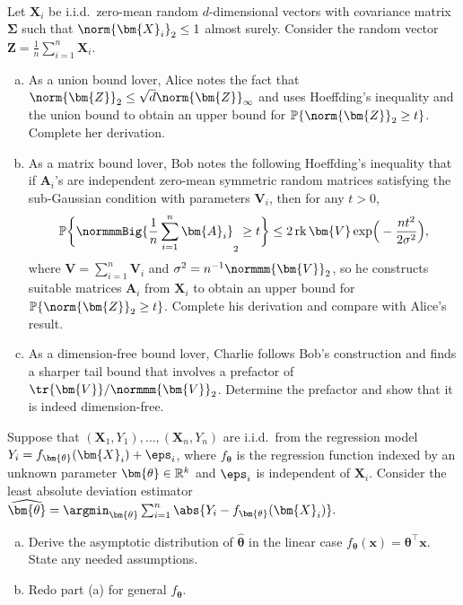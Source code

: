 \documentclass[12pt, a3paper, openany]{book}
\begin{document}
\begin{Prob}\ 

Let $\bm{X}_{i}$ be i.i.d.\ zero-mean random $d$-dimensional vectors with covariance matrix $\bm{\Sigma}$ such that $\norm{\bm{X}_{i}}_{2} \leq 1$ almost surely. Consider the random vector $\bm{Z} = \frac{1}{n}\sum_{i=1}^{n}\bm{X}_{i}$. 
\begin{enumerate}[(a)]
	\setlength{\itemsep}{0pt}
\item As a union bound lover, Alice notes the fact that $\norm{\bm{Z}}_{2} \leq \sqrt{d}\norm{\bm{Z}}_{\infty}$ and uses Hoeffding's inequality and the union bound to obtain an upper bound for $\P\{ \norm{\bm{Z}}_{2} \geq t \}$. Complete her derivation.
\item As a matrix bound lover, Bob notes the following Hoeffding's inequality that if $\bm{A}_{i}$'s are independent zero-mean symmetric random matrices satisfying the sub-Gaussian condition with parameters $\bm{V}_{i}$, then for any $t > 0$, \vspace{-2ex}
\[ \P\bigg\{ \normmmBig{\frac{1}{n}\sum_{i=1}^{n}\bm{A}_{i}}_{2} \geq t \bigg\} \leq 2 \rank{\bm{V}} \exp\!\Big(-\frac{nt^{2}}{2\sigma^{2}}\Big) , \]
where $\bm{V} = \sum_{i=1}^{n}\bm{V}_{i}$ and $\sigma^{2} = n^{-1}\normmm{\bm{V}}_{2}$, so he constructs suitable matrices $\bm{A}_{i}$ from $\bm{X}_{i}$ to obtain an upper bound for $\P\{ \norm{\bm{Z}}_{2} \geq t \}$. Complete his derivation and compare with Alice's result. 
\item As a dimension-free bound lover, Charlie follows Bob's construction and finds a sharper tail bound that involves a prefactor of $\tr{\bm{V}}/\normmm{\bm{V}}_{2}$. Determine the prefactor and show that it is indeed dimension-free. 
\end{enumerate}
\end{Prob}


\begin{Prob}
Suppose that $(\bm{X}_{1},Y_{1}),\dots,(\bm{X}_{n},Y_{n})$ are i.i.d.\ from the regression model $Y_{i} = f_{\bm{\theta}}(\bm{X}_{i}) + \eps_{i}$, where $f_{\bm{\theta}}$ is the regression function indexed by an unknown parameter $\bm{\theta} \in \R^{k}$ and $\eps_{i}$ is independent of $\bm{X}_{i}$. Consider the least absolute deviation estimator 
$ \widehat{\bm{\theta}} = \argmin_{\bm{\theta}} \sum_{i=1}^{n} \abs{Y_{i}-f_{\bm{\theta}}(\bm{X}_{i})} . $
\begin{enumerate}[(a)]
	\setlength{\itemsep}{0pt}
\item Derive the asymptotic distribution of $\widehat{\bm{\theta}}$ in the linear case $f_{\bm{\theta}}(\bm{x}) = \bm{\theta}^{\top}\bm{x}$. State any needed assumptions. 
\item Redo part (a) for general $f_{\bm{\theta}}$. 
\end{enumerate}
\end{Prob}
\end{document}
